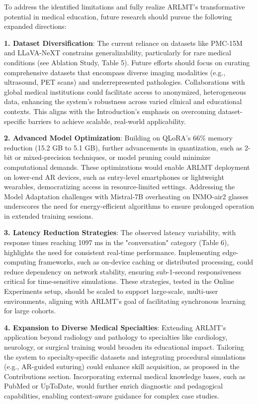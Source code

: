 \documentclass[10pt,letterpaper]{article}
\begin{document}
To address the identified limitations and fully realize ARLMT’s transformative potential in medical education, future research should pursue the following expanded directions:

\textbf{1. Dataset Diversification}: The current reliance on datasets like PMC-15M and LLaVA-NeXT constrains generalizability, particularly for rare medical conditions (see Ablation Study, Table 5). Future efforts should focus on curating comprehensive datasets that encompass diverse imaging modalities (e.g., ultrasound, PET scans) and underrepresented pathologies. Collaborations with global medical institutions could facilitate access to anonymized, heterogeneous data, enhancing the system’s robustness across varied clinical and educational contexts. This aligns with the Introduction’s emphasis on overcoming dataset-specific barriers to achieve scalable, real-world applicability.

\textbf{2. Advanced Model Optimization}: Building on QLoRA’s 66\% memory reduction (15.2 GB to 5.1 GB), further advancements in quantization, such as 2-bit or mixed-precision techniques, or model pruning could minimize computational demands. These optimizations would enable ARLMT deployment on lower-end AR devices, such as entry-level smartphones or lightweight wearables, democratizing access in resource-limited settings. Addressing the Model Adaptation challenges with Mistral-7B overheating on INMO-air2 glasses underscores the need for energy-efficient algorithms to ensure prolonged operation in extended training sessions.

\textbf{3. Latency Reduction Strategies}: The observed latency variability, with response times reaching 1097 ms in the "conversation" category (Table 6), highlights the need for consistent real-time performance. Implementing edge-computing frameworks, such as on-device caching or distributed processing, could reduce dependency on network stability, ensuring sub-1-second responsiveness critical for time-sensitive simulations. These strategies, tested in the Online Experiments setup, should be scaled to support large-scale, multi-user environments, aligning with ARLMT’s goal of facilitating synchronous learning for large cohorts.

\textbf{4. Expansion to Diverse Medical Specialties}: Extending ARLMT’s application beyond radiology and pathology to specialties like cardiology, neurology, or surgical training would broaden its educational impact. Tailoring the system to specialty-specific datasets and integrating procedural simulations (e.g., AR-guided suturing) could enhance skill acquisition, as proposed in the Contributions section. Incorporating external medical knowledge bases, such as PubMed or UpToDate, would further enrich diagnostic and pedagogical capabilities, enabling context-aware guidance for complex case studies.
\end{document}
